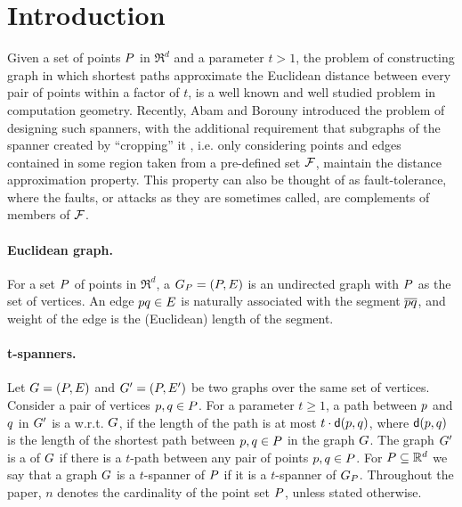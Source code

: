 \documentclass[12pt]{article}%
\begin{document}

\section{Introduction}

Given a set of points $P$ in $\Re^d$ and a parameter $t>1$, the problem of constructing graph in which shortest paths approximate the Euclidean distance between every pair of points within a factor of $t$, is a well known and well studied problem in computation geometry. Recently, Abam and Borouny \cite{ab-lgs-21} introduced the problem of designing such spanners, with the additional requirement that subgraphs of the spanner created by ``cropping'' it , i.e. only considering points and edges contained in some region taken from a pre-defined set $\mathcal{F}$, maintain the distance approximation property. This property can also be thought of as fault-tolerance, where the faults, or attacks as they are sometimes called, are complements of members of $\mathcal{F}$.


\paragraph{Euclidean graph.}
For a set $P$ of points in $\Re^d$, a 
$G_P = (P, E)$ is an undirected graph with $P$ as the set of
vertices. An edge $p q \in E$ is naturally associated with the
segment $\overline{pq}$, and weight of the edge is the (Euclidean) length of
the segment.


\paragraph{t-spanners.}
Let $G=(P,E)$ and $G'=(P,E')$ be two graphs over the same set of vertices. Consider a pair of vertices $p,q \in P$. For a
parameter $t \geq 1$, a path between $p$ and $q$ in $G'$ is a
 w.r.t. $G$, if the length of the path is at most
$t \cdot \dGY{\pa}{\pb}$, where $\dGY{\pa}{\pb}$ is the length
of the shortest path between $p,q\in P$ in the graph $G$.
The graph $G'$ is a  of
$G$ if there is a $t$-path between any pair of points $p,q\in P$.
For $P\subseteq \mathbb{R}^d$ we say that a graph $G$ is a $t$-spanner of $P$ if it is a $t$-spanner of $G_P$. Throughout the paper, $n$ denotes the cardinality of the point set $P$, unless stated otherwise. 
\end{document}
